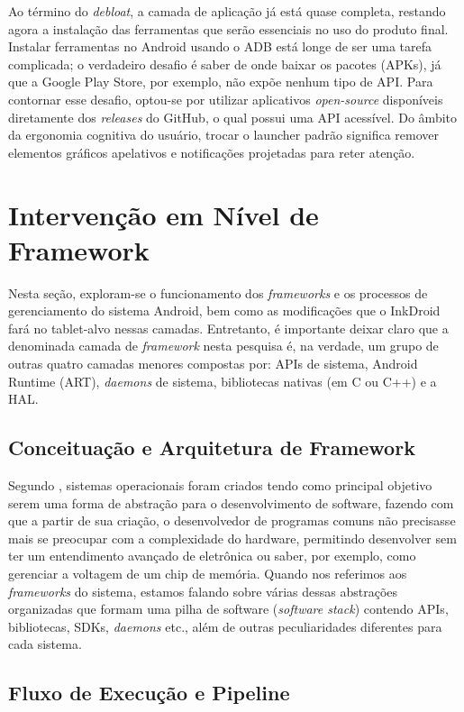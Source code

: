 \documentclass[
    12pt,
    openright,
    oneside,
    a4paper,
    english,
    brazilian
    ]{abntex2}
\begin{document}
Ao término do \textit{debloat}, a camada de aplicação já está quase completa, restando agora a instalação das ferramentas que serão essenciais no uso do produto final. Instalar ferramentas no Android usando o ADB está longe de ser uma tarefa complicada; o verdadeiro desafio é saber de onde baixar os pacotes (APKs), já que a Google Play Store, por exemplo, não expõe nenhum tipo de API. Para contornar esse desafio, optou-se por utilizar aplicativos \textit{open-source} disponíveis diretamente dos \textit{releases} do GitHub, o qual possui uma API acessível. Do âmbito da ergonomia cognitiva do usuário, trocar o launcher padrão significa remover elementos gráficos apelativos e notificações projetadas para reter atenção.

\section{Intervenção em Nível de Framework}

Nesta seção, exploram-se o funcionamento dos \textit{frameworks} e os processos de gerenciamento do sistema Android, bem como as modificações que o InkDroid fará no tablet-alvo nessas camadas. Entretanto, é importante deixar claro que a denominada camada de \textit{framework} nesta pesquisa é, na verdade, um grupo de outras quatro camadas menores compostas por: APIs de sistema, Android Runtime (ART), \textit{daemons} de sistema, bibliotecas nativas (em C ou C++) e a HAL.

\subsection{Conceituação e Arquitetura de Framework}

Segundo \cite{tanenbaum2016}, sistemas operacionais foram criados tendo como principal objetivo serem uma forma de abstração para o desenvolvimento de software, fazendo com que a partir de sua criação, o desenvolvedor de programas comuns não precisasse mais se preocupar com a complexidade do hardware, permitindo desenvolver sem ter um entendimento avançado de eletrônica ou saber, por exemplo, como gerenciar a voltagem de um chip de memória. Quando nos referimos aos \textit{frameworks} do sistema, estamos falando sobre várias dessas abstrações organizadas que formam uma pilha de software (\textit{software stack}) contendo APIs, bibliotecas, SDKs, \textit{daemons} etc., além de outras peculiaridades diferentes para cada sistema. 

\subsection{Fluxo de Execução e Pipeline}
\end{document}
